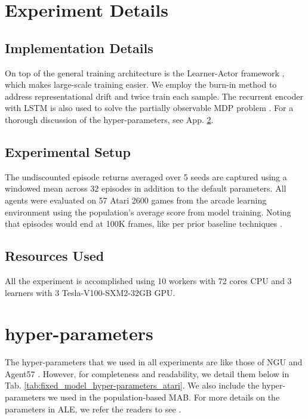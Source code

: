 \clearpage
\section{Experiment Details}
\label{sec:app Experiment Details}



\subsection{Implementation Details}


On top of the general training architecture is the Learner-Actor framework  \citep{impala}, which makes large-scale training easier. 
We employ the burn-in method  \citep{r2d2} to address representational drift and twice train each sample. The recurrent encoder with LSTM \citep{lstm} is also used to solve the partially observable MDP problem \citep{ale}. For a thorough discussion of the hyper-parameters, see App. \ref{Sec: appendix hyper-parameters}. 




\subsection{Experimental Setup}

The undiscounted episode returns averaged over 5 seeds are captured using a windowed mean across 32 episodes in addition to the default parameters. All agents were evaluated on 57 Atari 2600 games from the arcade learning environment \citep[ALE]{ale} using the population's average score from model training. Noting that episodes would end at 100K frames, like per prior baseline techniques \citep{rainbow,agent57,laser,ngu,r2d2}. 


\subsection{Resources Used}
\label{app: Resources Used}
All the experiment is accomplished using 10 workers with 72 cores CPU and 3 learners with 3 Tesla-V100-SXM2-32GB GPU.



\clearpage

\section{hyper-parameters}
\label{Sec: appendix hyper-parameters}
The hyper-parameters that we used in all experiments are like those of NGU \cite{ngu} and Agent57 \citep{agent57}. However, for completeness and readability, we detail
them below in  Tab. \ref{tab:fixed_model_hyper-parameters_atari}. We also include the hyper-parameters we used in the population-based MAB. For more details on the parameters in ALE, we refer the readers to see \citep{ale2}.


